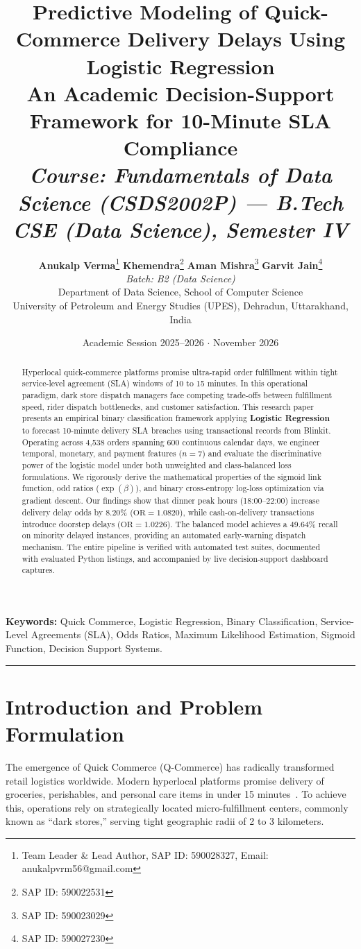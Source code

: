 \documentclass[11pt,a4paper]{article}
\title{
    \vspace{-1.5cm}
    \textbf{\huge Predictive Modeling of Quick-Commerce Delivery Delays Using Logistic Regression} \\[0.35cm]
    \large An Academic Decision-Support Framework for 10-Minute SLA Compliance \\[0.15cm]
    \normalsize \textit{Course: Fundamentals of Data Science (CSDS2002P) --- B.Tech CSE (Data Science), Semester IV}
}
\author{
    \textbf{Anukalp Verma}\thanks{Team Leader \& Lead Author, SAP ID: 590028327, Email: anukalpvrm56@gmail.com} \quad
    \textbf{Khemendra}\thanks{SAP ID: 590022531} \quad
    \textbf{Aman Mishra}\thanks{SAP ID: 590023029} \quad
    \textbf{Garvit Jain}\thanks{SAP ID: 590027230} \\[0.25cm]
    \textit{Batch: B2 (Data Science)} \\[0.15cm]
    Department of Data Science, School of Computer Science \\
    University of Petroleum and Energy Studies (UPES), Dehradun, Uttarakhand, India
}
\date{Academic Session 2025--2026 $\cdot$ November 2026}
\begin{document}
\maketitle
\thispagestyle{fancy}

\begin{abstract}
Hyperlocal quick-commerce platforms promise ultra-rapid order fulfillment within tight service-level agreement (SLA) windows of 10 to 15 minutes. In this operational paradigm, dark store dispatch managers face competing trade-offs between fulfillment speed, rider dispatch bottlenecks, and customer satisfaction. This research paper presents an empirical binary classification framework applying \textbf{Logistic Regression} to forecast 10-minute delivery SLA breaches using transactional records from Blinkit. Operating across 4,538 orders spanning 600 continuous calendar days, we engineer temporal, monetary, and payment features ($n=7$) and evaluate the discriminative power of the logistic model under both unweighted and class-balanced loss formulations. We rigorously derive the mathematical properties of the sigmoid link function, odd ratios ($\exp(\beta)$), and binary cross-entropy log-loss optimization via gradient descent. Our findings show that dinner peak hours (18:00--22:00) increase delivery delay odds by 8.20\% ($\text{OR} = 1.0820$), while cash-on-delivery transactions introduce doorstep delays ($\text{OR} = 1.0226$). The balanced model achieves a 49.64\% recall on minority delayed instances, providing an automated early-warning dispatch mechanism. The entire pipeline is verified with automated test suites, documented with evaluated Python listings, and accompanied by live decision-support dashboard captures.
\end{abstract}

\noindent\textbf{Keywords:} Quick Commerce, Logistic Regression, Binary Classification, Service-Level Agreements (SLA), Odds Ratios, Maximum Likelihood Estimation, Sigmoid Function, Decision Support Systems.

\vspace{0.2cm}
\hrule
\vspace{0.3cm}

\section{Introduction and Problem Formulation}
\label{sec:intro}
The emergence of Quick Commerce (Q-Commerce) has radically transformed retail logistics worldwide. Modern hyperlocal platforms promise delivery of groceries, perishables, and personal care items in under 15 minutes~\cite{qcommerce2023}. To achieve this, operations rely on strategically located micro-fulfillment centers, commonly known as ``dark stores,'' serving tight geographic radii of 2 to 3 kilometers.
\end{document}
